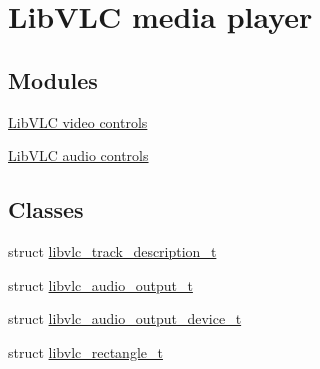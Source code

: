 \hypertarget{group__libvlc__media__player}{}\section{Lib\+V\+LC media player}
\label{group__libvlc__media__player}
\subsection*{Modules}
\begin{DoxyCompactItemize}
\item 
\hyperlink{group__libvlc__video}{Lib\+V\+L\+C video controls}
\item 
\hyperlink{group__libvlc__audio}{Lib\+V\+L\+C audio controls}
\end{DoxyCompactItemize}
\subsection*{Classes}
\begin{DoxyCompactItemize}
\item 
struct \hyperlink{structlibvlc__track__description__t}{libvlc\+\_\+track\+\_\+description\+\_\+t}
\item 
struct \hyperlink{structlibvlc__audio__output__t}{libvlc\+\_\+audio\+\_\+output\+\_\+t}
\item 
struct \hyperlink{structlibvlc__audio__output__device__t}{libvlc\+\_\+audio\+\_\+output\+\_\+device\+\_\+t}
\item 
struct \hyperlink{structlibvlc__rectangle__t}{libvlc\+\_\+rectangle\+\_\+t}
\end{DoxyCompactItemize}
